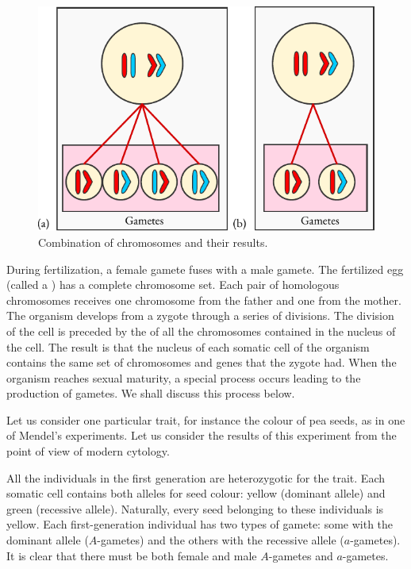 \begin{figure}[!ht]
\centering
\includegraphics[width=0.9\tfwidth]{figures/genes0.pdf}
\caption{Combination of chromosomes and their results.\label{genes0}}
\end{figure}

During fertilization, a female gamete fuses with a male gamete. The
fertilized egg (called a ) has a complete chromosome set. Each pair of homologous chromosomes receives one chromosome from the father and one from the mother. The organism develops from a zygote through a series of divisions. The division of the cell is preceded by the  of all the chromosomes contained in the nucleus of the cell. The result is that the nucleus of each somatic cell of the organism contains the same set of chromosomes and genes that the zygote had. When the organism reaches sexual maturity, a special process occurs leading to the production of gametes. We shall discuss this process
below.

 Let us consider one particular trait, for
instance the colour of pea seeds, as in one of Mendel's experiments. Let
us consider the results of this experiment from the point of view of
modern cytology.

All the individuals in the first generation are heterozygotic for the
trait. Each somatic cell contains both alleles for seed colour: yellow
(dominant allele) and green (recessive allele). Naturally, every seed
belonging to these individuals is yellow. Each first-generation individual
has two types of gamete: some with the dominant allele ($A$-gametes) and
the others with the recessive allele ($a$-gametes). It is clear that there must
be both female and male $A$-gametes and $a$-gametes.

